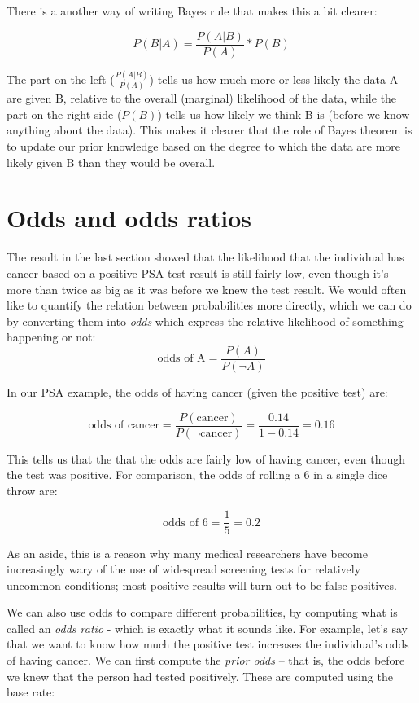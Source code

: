 \documentclass[]{book}
\theoremstyle{definition}
\theoremstyle{definition}
\theoremstyle{definition}
\theoremstyle{remark}
\begin{document}
There is a another way of writing Bayes rule that makes this a bit
clearer:

\[
P(B|A) = \frac{P(A|B)}{P(A)}*P(B)
\]

The part on the left (\(\frac{P(A|B)}{P(A)}\)) tells us how much more or
less likely the data A are given B, relative to the overall (marginal)
likelihood of the data, while the part on the right side (\(P(B)\))
tells us how likely we think B is (before we know anything about the
data). This makes it clearer that the role of Bayes theorem is to update
our prior knowledge based on the degree to which the data are more
likely given B than they would be overall.

\section{Odds and odds ratios}\label{odds-and-odds-ratios}

The result in the last section showed that the likelihood that the
individual has cancer based on a positive PSA test result is still
fairly low, even though it's more than twice as big as it was before we
knew the test result. We would often like to quantify the relation
between probabilities more directly, which we can do by converting them
into \emph{odds} which express the relative likelihood of something
happening or not:\\
\[
\text{odds of A} = \frac{P(A)}{P(\neg A)}
\]

In our PSA example, the odds of having cancer (given the positive test)
are:

\[
\text{odds of cancer} = \frac{P(\text{cancer})}{P(\neg \text{cancer})} =\frac{0.14}{1 - 0.14} = 0.16
\]

This tells us that the that the odds are fairly low of having cancer,
even though the test was positive. For comparison, the odds of rolling a
6 in a single dice throw are:

\[
\text{odds of 6} = \frac{1}{5} = 0.2
\]

As an aside, this is a reason why many medical researchers have become
increasingly wary of the use of widespread screening tests for
relatively uncommon conditions; most positive results will turn out to
be false positives.

We can also use odds to compare different probabilities, by computing
what is called an \emph{odds ratio} - which is exactly what it sounds
like. For example, let's say that we want to know how much the positive
test increases the individual's odds of having cancer. We can first
compute the \emph{prior odds} -- that is, the odds before we knew that
the person had tested positively. These are computed using the base
rate:
\end{document}
